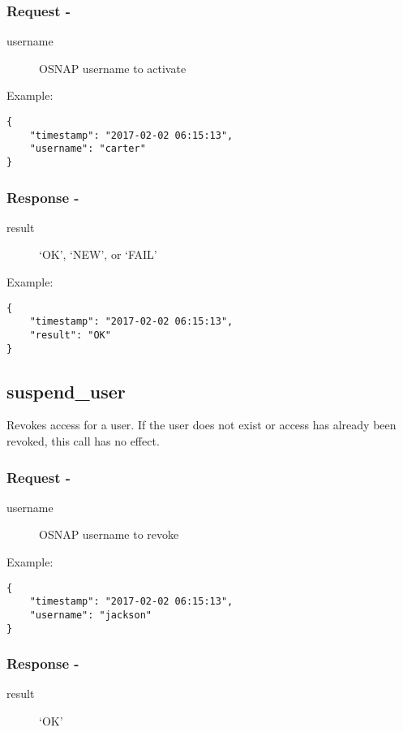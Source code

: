 \subsubsection*{Request -}
\begin{description}
\item[username] OSNAP username to activate
\end{description}

\noindent Example:
\begin{verbatim}
{
    "timestamp": "2017-02-02 06:15:13",
    "username": "carter"
}
\end{verbatim}


\subsubsection*{Response -}
\begin{description}
\item[result] `OK', `NEW', or `FAIL'
\end{description}

\noindent Example:
\begin{verbatim}
{
    "timestamp": "2017-02-02 06:15:13",
    "result": "OK"
}
\end{verbatim}


\subsection*{suspend\_user}
Revokes access for a user. If the user does not exist or access has already been revoked, this call has no effect.
\\

\subsubsection*{Request -}
\begin{description}
\item[username] OSNAP username to revoke
\end{description}

\noindent Example:
\begin{verbatim}
{
    "timestamp": "2017-02-02 06:15:13",
    "username": "jackson"
}
\end{verbatim}


\subsubsection*{Response -}
\begin{description}
\item[result] `OK'
\end{description}

